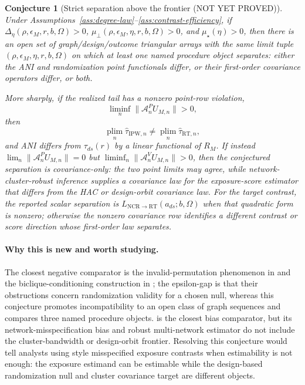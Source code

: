\documentclass[11pt]{article}
\newcommand{\plim}{\operatorname*{plim}}
\theoremstyle{definition}
\theoremstyle{plain}
\newtheorem{conjecture}{Conjecture}
\theoremstyle{remark}
\begin{document}
\begin{conjecture}[Strict separation above the frontier (NOT YET PROVED)]\label{conj:strict-separation}
Under Assumptions~\ref{ass:degree-law}--\ref{ass:contrast-efficiency}, if
\(\Delta_\eta(\rho,\epsilon_M,r,b,\Omega)>0\),
\(\mu_{\perp}(\rho,\epsilon_M,\eta,r,b,\Omega)>0\), and
\(\mu_\star(\eta)>0\), then there is an open set of graph/design/outcome
triangular arrays with the same limit tuple
\((\rho,\epsilon_M,\eta,r,b,\Omega)\)
on which at least one named procedure object separates: either the ANI and
randomization point functionals differ, or their first-order covariance
operators differ, or both.

More sharply, if the realized tail has a nonzero point-row violation,
\[
  \liminf_n \|\mathcal A^P_n U_{M,n}\|>0,
\]
then
\[
  \plim_n \hat\tau_{\mathrm{IPW},n}
  \ne
  \plim_n \hat\tau_{\mathrm{RT},n},
\]
and ANI differs from \(\tau_{ds}(r)\) by a linear functional of \(R_M\).  If
instead \(\lim_n\|\mathcal A^P_n U_{M,n}\|=0\) but
\(\liminf_n\|\mathcal A^V_n U_{M,n}\|>0\), then the conjectured separation is
covariance-only: the two point limits may agree, while network-cluster-robust
inference supplies a covariance law for the exposure-score estimator that
differs from the HAC or design-orbit covariance law.  For the target contrast,
the reported scalar separation is
\(L_{\mathrm{NCR}\to\mathrm{RT}}(a_{ds};b,\Omega)\) when that quadratic form is
nonzero; otherwise the nonzero covariance row identifies a different contrast
or score direction whose first-order law separates.
\end{conjecture}

\paragraph{Why this is new and worth studying.}
The closest negative comparator is the invalid-permutation phenomenon in
\citet{BasseDingFellerToulis2024} and the biclique-conditioning construction
in \citet{PuelzBasseFellerToulis2022}; the epsilon-gap is that their
obstructions concern randomization validity for a chosen null, whereas this
conjecture promotes incompatibility to an open class of graph sequences and
compares three named procedure objects.  \citet{WeinsteinNevo2026} is the
closest bias comparator, but its network-misspecification bias and robust
multi-network estimator do not include the cluster-bandwidth or design-orbit
frontier.  Resolving this conjecture would tell analysts using
\citet{Savje2024MisspecifiedExposure} style misspecified exposure contrasts
when estimability is not enough: the exposure estimand can be estimable while
the design-based randomization null and cluster covariance target are
different objects.
\end{document}
